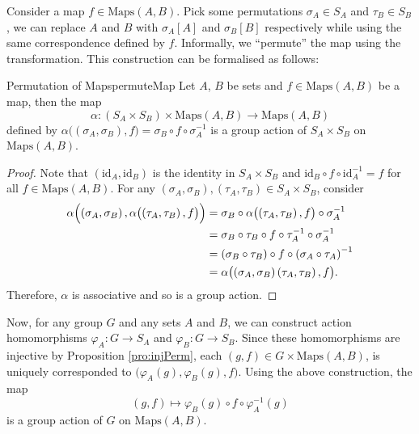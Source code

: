 \documentclass[math]{amznotes}
\theoremstyle{remark}
\newcommand{\0}{\mathbf{0}}
\newcommand{\1}{\mathbf{1}}
\begin{document}
Consider a map $f \in \mathrm{Maps}\left(A, B\right)$. Pick some permutations $\sigma_A \in S_A$ and $\tau_B \in S_B$, we can replace $A$ and $B$ with $\sigma_A\left[A\right]$ and $\sigma_B\left[B\right]$ respectively while using the same correspondence defined by $f$. Informally, we ``permute'' the map using the transformation. This construction can be formalised as follows:
\begin{probox}{Permutation of Maps}{permuteMap}
    Let $A$, $B$ be sets and $f \in \mathrm{Maps}\left(A, B\right)$ be a map, then the map 
    \begin{equation*}
        \alpha \colon \left(S_A \times S_B\right) \times \mathrm{Maps}\left(A, B\right) \to \mathrm{Maps}\left(A, B\right)
    \end{equation*}
    defined by $\alpha\bigl(\left(\sigma_A, \sigma_B\right), f\bigr) = \sigma_B \circ f \circ \sigma_A^{-1}$ is a group action of $S_A \times S_B$ on $\mathrm{Maps}\left(A, B\right)$.
    \tcblower
    \begin{proof}
        Note that $\left(\mathrm{id}_{A}, \mathrm{id}_B\right)$ is the identity in $S_A \times S_B$ and $\mathrm{id}_B \circ f \circ \mathrm{id}_A^{-1} = f$ for all $f \in \mathrm{Maps}\left(A, B\right)$. For any $\left(\sigma_A, \sigma_B\right), \left(\tau_A, \tau_B\right) \in S_A \times S_B$, consider 
        \begin{align*}
            \alpha\Bigl(\left(\sigma_A, \sigma_B\right), \alpha\bigl(\left(\tau_A, \tau_B\right), f\bigr)\Bigr) & = \sigma_B \circ \alpha\bigl(\left(\tau_A, \tau_B\right), f\bigr) \circ \sigma_A^{-1} \\
            & = \sigma_B \circ \tau_B \circ f \circ \tau_A^{-1} \circ \sigma_A^{-1} \\
            & = \left(\sigma_B \circ \tau_B\right) \circ f \circ \left(\sigma_A \circ \tau_A\right)^{-1} \\
            & = \alpha\bigl(\left(\sigma_A, \sigma_B\right)\left(\tau_A, \tau_B\right), f\bigr).
        \end{align*}
        Therefore, $\alpha$ is associative and so is a group action.
    \end{proof}
\end{probox}
Now, for any group $G$ and any sets $A$ and $B$, we can construct action homomorphisms $\varphi_A \colon G \to S_A$ and $\varphi_B \colon G \to S_B$. Since these homomorphisms are injective by Proposition \ref{pro:injPerm}, each $\left(g, f\right) \in G \times \mathrm{Maps}\left(A, B\right)$, is uniquely corresponded to $\bigl(\varphi_A\left(g\right), \varphi_B\left(g\right), f\bigr)$. Using the above construction, the map 
\begin{equation*}
    \left(g, f\right) \mapsto \varphi_B\left(g\right) \circ f \circ \varphi_A^{-1}\left(g\right)
\end{equation*}
is a group action of $G$ on $\mathrm{Maps}\left(A, B\right)$.
\end{document}
